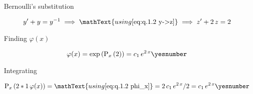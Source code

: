 \documentclass["AM3C-tests_resolutions.tex"]{subfiles}
\begin{document}
\begin{questionBox}
  Bernoulli's substitution
  \begin{tcolorbox}
    \begin{gather*}
      y' + y = y^{-1}
      \implies \mathText{using \eqref{eq:q.1.2 y->z}}
      \implies
      z' + 2\,z = 2
    \end{gather*}
  \end{tcolorbox}

  Finding \(\varphi(x)\)
  \begin{tcolorbox}
    \begin{gather*}
      \varphi(x)
      = \exp{\left(
          \prim_x{(2)}
      \right)}
      = 
      c_1\,e^{2\,x}
      \yesnumber\label{eq:q.1.2 phi_x}
    \end{gather*}
  \end{tcolorbox}

  Integrating
  \begin{tcolorbox}
    \begin{gather*}
      \prim_x{\left(
          2*1\,\varphi(x)
      \right)}
      = \mathText{using \eqref{eq:q.1.2 phi_x}}
      = 2\,c_1\,e^{2\,x}/2 
      = c_1\,e^{2\,x}
      \yesnumber\label{eq:q.1.2 prim}
    \end{gather*}
  \end{tcolorbox}
\end{questionBox}
\end{document}
